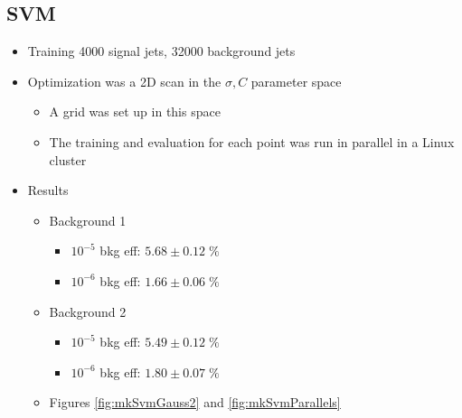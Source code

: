 \documentclass[a4paper]{jpconf}
\begin{document}
\subsection{SVM}

\begin{itemize}
\item Training 4000 signal jets, 32000 background jets
\item Optimization was a 2D scan in the $\sigma, C$ parameter space
  \begin{itemize}
  \item A grid was set up in this space
  \item The training and evaluation for each point was run in parallel in a Linux cluster
  \end{itemize}
\item Results
  \begin{itemize}
  \item Background 1
    \begin{itemize}
    \item $10^{-5}$ bkg eff: $5.68\pm 0.12\;\%$
    \item $10^{-6}$ bkg eff: $1.66\pm 0.06\;\%$
    \end{itemize}
  \item Background 2
    \begin{itemize}
    \item $10^{-5}$ bkg eff: $5.49\pm 0.12\;\%$
    \item $10^{-6}$ bkg eff: $1.80\pm 0.07\;\%$
    \end{itemize}
  \item Figures \ref{fig:mkSvmGauss2} and \ref{fig:mkSvmParallels}
  \end{itemize}
\end{itemize}
\end{document}
